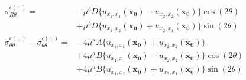 \begin{align}
		\nonumber
		\\
	\sigma_{R\theta}^{\epsilon(-)}
		=&-\mu^{b}D\bigl\{u_{x_{1},x_{1}}(\bm{x_{0}})-u_{x_{2},x_{2}}(\bm{x_{0}})\bigr\}\cos(2\theta)
		\nonumber
		\\
		&+\mu^{b}D\bigl\{u_{x_{1},x_{2}}(\bm{x_{0}})+u_{x_{2},x_{1}}(\bm{x_{0}})\bigr\}\sin(2\theta)
		\nonumber
		\\
	\sigma_{\theta\theta}^{\epsilon(-)}-\sigma_{\theta\theta}^{\epsilon(+)}
		=&-4\mu^{a}A\bigl\{u_{x_{1},x_{1}}(\bm{x_{0}})+u_{x_{2},x_{2}}(\bm{x_{0}})\bigr\}
		\nonumber
		\\
		&+4\mu^{a}B\bigl\{u_{x_{1},x_{1}}(\bm{x_{0}})-u_{x_{2},x_{2}}(\bm{x_{0}})\bigr\}\cos(2\theta)
		\nonumber
		\\
		&+4\mu^{a}B\bigl\{u_{x_{1},x_{2}}(\bm{x_{0}})+u_{x_{2},x_{1}}(\bm{x_{0}})\bigr\}\sin(2\theta)
	\label{eq:eThThOutEpsSol}
\end{align}

